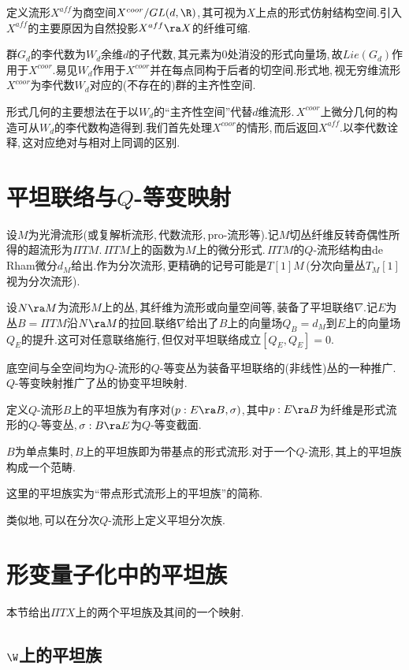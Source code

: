 定义流形$X^{aff}$为商空间$X^{coor}/GL(d,\R)$,\,其可视为$X$上点的形式仿射结构空间.引入$X^{aff}$的主要原因为自然投影$X^{aff}\ra X$的纤维可缩.

群$G_d$的李代数为$W_d$余维$d$的子代数,\,其元素为$0$处消没的形式向量场,\,故$Lie(G_d)$作用于$X^{coor}$.易见$W_d$作用于$X^{coor}$并在每点同构于后者的切空间.形式地,\,视无穷维流形$X^{coor}$为李代数$W_d$对应的(不存在的)群的主齐性空间.

形式几何的主要想法在于以$W_d$的``主齐性空间''代替$d$维流形.\,$X^{coor}$上微分几何的构造可从$W_d$的李代数构造得到.我们首先处理$X^{coor}$的情形,\,而后返回$X^{aff}$.以李代数诠释,\,这对应绝对与相对上同调的区别.


\section{平坦联络与$Q$-等变映射}

设$M$为光滑流形(或复解析流形,\,代数流形,\,pro-流形等).记$M$切丛纤维反转奇偶性所得的超流形为$\Pi T M$.\,$\Pi T M$上的函数为$M$上的微分形式.\,$\Pi TM$的$Q$-流形结构由de Rham微分$d_M$给出.作为分次流形,\,更精确的记号可能是$T[1] M$\,(分次向量丛$T_M[1]$视为分次流形).

设$N\ra M$为流形$M$上的丛,\,其纤维为流形或向量空间等,\,装备了平坦联络$\nabla$.记$E$为丛$B=\Pi TM$沿$N\ra M$的拉回.联络$\nabla$给出了$B$上的向量场$Q_B=d_M$到$E$上的向量场$Q_E$的提升.这可对任意联络施行,\,但仅对平坦联络成立$[Q_E,Q_E]=0$.

底空间与全空间均为$Q$-流形的$Q$-等变丛为装备平坦联络的(非线性)丛的一种推广.\,$Q$-等变映射推广了丛的协变平坦映射.

定义$Q$-流形$B$上的平坦族为有序对$(p:E\ra B,\sigma)$,\,其中$p:E\ra B$为纤维是形式流形的$Q$-等变丛,\,$\sigma :B\ra E$为$Q$-等变截面.

$B$为单点集时,\,$B$上的平坦族即为带基点的形式流形.对于一个$Q$-流形,\,其上的平坦族构成一个范畴.

这里的平坦族实为``带点形式流形上的平坦族''的简称.

类似地,\,可以在分次$Q$-流形上定义平坦分次族.



\section{形变量子化中的平坦族}

本节给出$\Pi TX$上的两个平坦族及其间的一个映射.


\subsection{$\W$上的平坦族}

